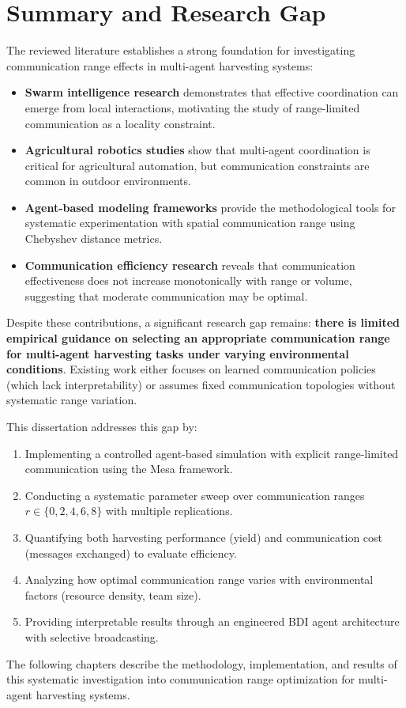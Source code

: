 \section{Summary and Research Gap}

The reviewed literature establishes a strong foundation for investigating communication range effects in multi-agent harvesting systems:

\begin{itemize}
    \item \textbf{Swarm intelligence research} \citep{dorigo2004ant} demonstrates that effective coordination can emerge from local interactions, motivating the study of range-limited communication as a locality constraint.

    \item \textbf{Agricultural robotics studies} \citep{seyyedhasani2018, albani2017} show that multi-agent coordination is critical for agricultural automation, but communication constraints are common in outdoor environments.

    \item \textbf{Agent-based modeling frameworks} \citep{kazil2020} provide the methodological tools for systematic experimentation with spatial communication range using Chebyshev distance metrics.

    \item \textbf{Communication efficiency research} \citep{zhang2024} reveals that communication effectiveness does not increase monotonically with range or volume, suggesting that moderate communication may be optimal.
\end{itemize}

Despite these contributions, a significant research gap remains: \textbf{there is limited empirical guidance on selecting an appropriate communication range for multi-agent harvesting tasks under varying environmental conditions}. Existing work either focuses on learned communication policies (which lack interpretability) or assumes fixed communication topologies without systematic range variation.

This dissertation addresses this gap by:

\begin{enumerate}
    \item Implementing a controlled agent-based simulation with explicit range-limited communication using the Mesa framework.

    \item Conducting a systematic parameter sweep over communication ranges $r \in \{0, 2, 4, 6, 8\}$ with multiple replications.

    \item Quantifying both harvesting performance (yield) and communication cost (messages exchanged) to evaluate efficiency.

    \item Analyzing how optimal communication range varies with environmental factors (resource density, team size).

    \item Providing interpretable results through an engineered BDI agent architecture with selective broadcasting.
\end{enumerate}

The following chapters describe the methodology, implementation, and results of this systematic investigation into communication range optimization for multi-agent harvesting systems.
